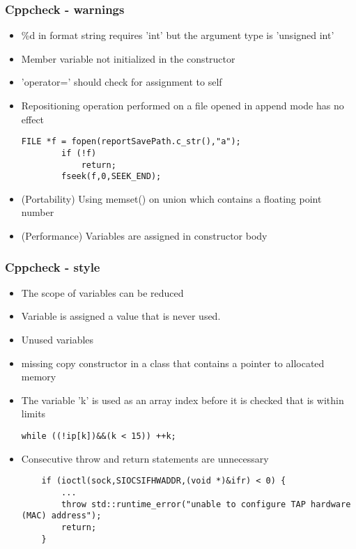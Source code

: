 \documentclass{beamer}
\begin{document}
\begin{frame}[fragile]
\frametitle{Cppcheck - warnings}
\begin{itemize}
\item \%d in format string requires 'int' but the argument type is 'unsigned int'
\item Member variable not initialized in the constructor
\item 'operator=' should check for assignment to self 
\item Repositioning operation performed on a file opened in append mode has no effect
\begin{lstlisting}
FILE *f = fopen(reportSavePath.c_str(),"a");
		if (!f)
			return;
		fseek(f,0,SEEK_END);
\end{lstlisting}
\item (Portability) Using memset() on union which contains a floating point number
\item (Performance)  Variables are assigned in constructor body
\end{itemize}
\end{frame}

\begin{frame}[fragile]
\frametitle{Cppcheck - style}
\begin{itemize}
\item The scope of variables can be reduced
\item Variable is assigned a value that is never used.
\item Unused variables
\item missing copy constructor in a class that contains a pointer to allocated memory
\item The variable 'k' is used as an array index before it is checked that is within limits
\begin{lstlisting}
while ((!ip[k])&&(k < 15)) ++k;
\end{lstlisting}
\item Consecutive throw and return statements are unnecessary
\begin{lstlisting}
	if (ioctl(sock,SIOCSIFHWADDR,(void *)&ifr) < 0) {
		...
		throw std::runtime_error("unable to configure TAP hardware (MAC) address");
		return;
	}
\end{lstlisting}
\end{itemize}
\end{frame}
\end{document}

